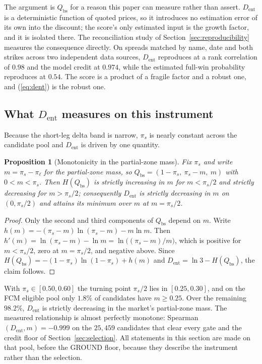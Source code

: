 \documentclass[11pt]{article}
\newtheorem{proposition}{Proposition}
\newcommand{\dent}{D_{\mathrm{ent}}}
\newcommand{\Qbs}{Q_{\mathrm{bs}}}
\begin{document}
The argument is $\Qbs$ for a reason this paper can measure rather than assert.
$\dent$ is a deterministic function of quoted prices, so it introduces no
estimation error of its own into the discount; the score's only estimated input
is the growth factor, and it is isolated there. The reconciliation study of
Section~\ref{sec:reproducibility} measures the consequence directly. On spreads matched by name, date and both strikes
across two independent data sources, $\dent$ reproduces at a rank correlation
of $0.98$ and the model credit at $0.974$, while the estimated full-win
probability reproduces at $0.54$. The score is a product of a fragile factor
and a robust one, and (\ref{eq:dent}) is the robust one.

\subsection{What \texorpdfstring{$\dent$}{D-ent} measures on this instrument}
\label{sec:geometry}

Because the short-leg delta band is narrow, $\pi_s$ is nearly constant across
the candidate pool and $\dent$ is driven by one quantity.

\begin{proposition}[Monotonicity in the partial-zone mass]
\label{prop:monotone}
Fix $\pi_s$ and write $m = \pi_s - \pi_\ell$ for the partial-zone mass, so
$\Qbs = (1 - \pi_s,\ \pi_s - m,\ m)$ with $0 < m < \pi_s$. Then $H(\Qbs)$ is
strictly increasing in $m$ for $m < \pi_s/2$ and strictly decreasing for
$m > \pi_s/2$; consequently $\dent$ is strictly \emph{decreasing} in $m$ on
$(0, \pi_s/2)$ and attains its minimum over $m$ at $m = \pi_s/2$.
\end{proposition}

\begin{proof}
Only the second and third components of $\Qbs$ depend on $m$. Write
$h(m) = -(\pi_s - m)\ln(\pi_s - m) - m \ln m$. Then
$h'(m) = \ln(\pi_s - m) - \ln m = \ln\bigl((\pi_s - m)/m\bigr)$, which is
positive for $m < \pi_s/2$, zero at $m = \pi_s/2$, and negative above. Since
$H(\Qbs) = -(1-\pi_s)\ln(1-\pi_s) + h(m)$ and $\dent = \ln 3 - H(\Qbs)$, the
claim follows.
\end{proof}

With $\pi_s \in [0.50, 0.60]$ the turning point $\pi_s/2$ lies in
$[0.25, 0.30]$, and on the FCM eligible pool only $1.8\%$ of candidates have
$m \geq 0.25$. Over the remaining $98.2\%$, $\dent$ is strictly decreasing in
the market's partial-zone mass. The measured relationship is almost perfectly
monotone: Spearman$(\dent, m) = -0.999$ on the $25{,}459$ candidates that
clear every gate and the credit floor of Section~\ref{sec:selection}. All
statements in this section are made on that pool, before the GROUND floor,
because they describe the instrument rather than the selection.
\end{document}
